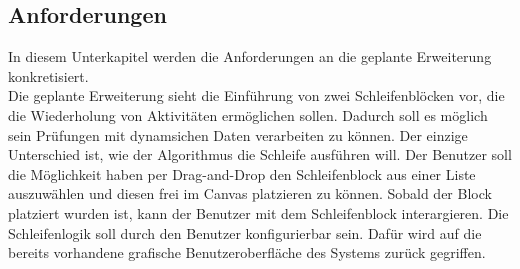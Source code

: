 \documentclass{article}
\begin{document}
    \subsection{Anforderungen}
    \label{Anforderungen}
    In diesem Unterkapitel werden die Anforderungen an die geplante Erweiterung konkretisiert.
    \\
    Die geplante Erweiterung sieht die Einführung von zwei Schleifenblöcken vor, die die Wiederholung von Aktivitäten ermöglichen sollen. 
    Dadurch soll es möglich sein Prüfungen mit dynamsichen Daten verarbeiten zu können.
    Der einzige Unterschied ist, wie der Algorithmus die Schleife ausführen will.
    Der Benutzer soll die Möglichkeit haben per Drag-and-Drop den Schleifenblock aus einer Liste auszuwählen und diesen frei im Canvas platzieren zu können.
    Sobald der Block platziert wurden ist, kann der Benutzer mit dem Schleifenblock interargieren.
    Die Schleifenlogik soll durch den Benutzer konfigurierbar sein. 
    Dafür wird auf die bereits vorhandene grafische Benutzeroberfläche des Systems zurück gegriffen.
\end{document}

